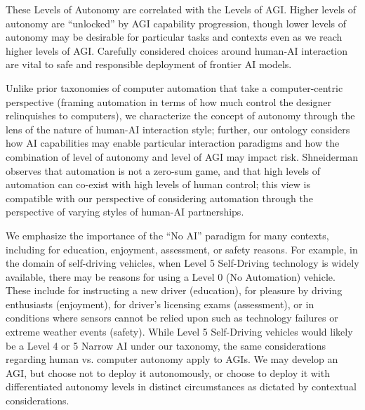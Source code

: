 \documentclass{article}
\theoremstyle{plain}
\theoremstyle{definition}
\theoremstyle{remark}
\begin{document}
These Levels of Autonomy are correlated with the Levels of AGI. Higher levels of autonomy are “unlocked” by AGI capability progression, though lower levels of autonomy may be desirable for particular tasks and contexts even as we reach higher levels of AGI. Carefully considered choices around human-AI interaction are vital to safe and responsible deployment of frontier AI models. 

Unlike prior taxonomies of computer automation \citep{sheridan1978human, auto8levels, auto10levels} that take a computer-centric perspective (framing automation in terms of how much control the designer relinquishes to computers), we characterize the concept of autonomy through the lens of the nature of human-AI interaction style; further, our ontology considers how AI capabilities may enable particular interaction paradigms and how the combination of level of autonomy and level of AGI may impact risk. Shneiderman \citep{shneiderman2020humancentered} observes that automation is not a zero-sum game, and that high levels of automation can co-exist with high levels of human control; this view is compatible with our perspective of considering automation through the perspective of varying styles of human-AI partnerships.  

We emphasize the importance of the “No AI” paradigm for many contexts, including for education, enjoyment, assessment, or safety reasons. For example, in the domain of self-driving vehicles, when Level 5 Self-Driving technology is widely available, there may be reasons for using a Level 0 (No Automation) vehicle. These include for instructing a new driver (education), for pleasure by driving enthusiasts (enjoyment), for driver’s licensing exams (assessment), or in conditions where sensors cannot be relied upon such as technology failures or extreme weather events (safety). While Level 5 Self-Driving \citep{drivingLevels} vehicles would likely be a Level 4 or 5 Narrow AI under our taxonomy,
the same considerations regarding human vs. computer autonomy apply to AGIs. We may develop an AGI, but choose not to deploy it autonomously, or choose to deploy it with differentiated autonomy levels in distinct circumstances as dictated by contextual considerations. 
\end{document}
